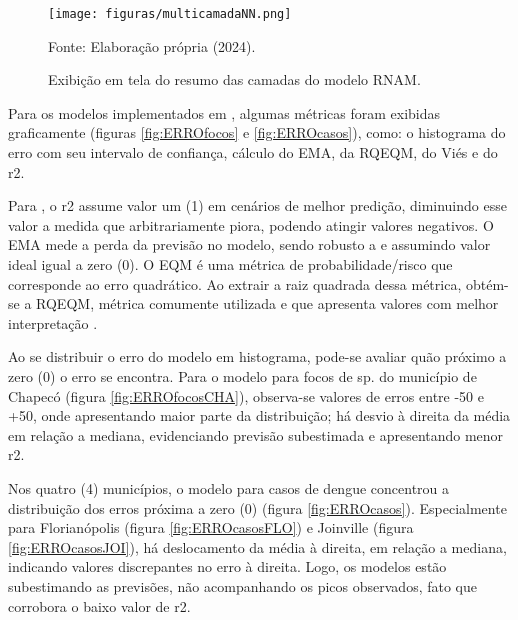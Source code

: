 \begin{figure}[htbp]
    \begin{center}
    \caption{Exibição em tela do resumo das camadas do modelo \acrshort{RNAM}.}
    \label{fig:multicamadaNN}
    \texttt{[image: figuras/multicamadaNN.png]}
    \end{center}
    \small{Fonte: Elaboração própria (2024).}
\end{figure}

\indent Para os modelos implementados em , algumas métricas foram exibidas graficamente (figuras \ref{fig:ERROfocos} e \ref{fig:ERROcasos}), como: o histograma do erro com seu intervalo de confiança, cálculo do \acrfull{EMA}, da \acrfull{RQEQM}, do Viés e do \acrfull{r2}.

\indent Para , o \acrshort{r2} assume valor um (1) em cenários de melhor predição, diminuindo esse valor a medida que arbitrariamente piora, podendo atingir valores negativos. O \acrfull{EMA} mede a perda da previsão no modelo, sendo robusto a  e assumindo valor ideal igual a zero (0). O \acrshort{EQM} é uma métrica de probabilidade/risco que corresponde ao erro quadrático. Ao extrair a raiz quadrada dessa métrica, obtém-se a \acrshort{RQEQM}, métrica comumente utilizada e que apresenta valores com melhor interpretação \cite{sklearn_2013_buitinck}.

\indent Ao se distribuir o erro do modelo em histograma, pode-se avaliar quão próximo a zero (0) o erro se encontra. Para o modelo  para focos de  sp. do município de Chapecó (figura \ref{fig:ERROfocosCHA}), observa-se valores de erros entre -50 e +50, onde apresentando maior parte da distribuição; há desvio à direita da média em relação a mediana, evidenciando previsão subestimada e apresentando menor \acrlong{r2}.

\indent Nos quatro (4) municípios, o modelo  para casos de dengue concentrou a distribuição dos erros próxima a zero (0) (figura \ref{fig:ERROcasos}). Especialmente para Florianópolis (figura \ref{fig:ERROcasosFLO}) e Joinville (figura \ref{fig:ERROcasosJOI}), há deslocamento da média à direita, em relação a mediana, indicando valores discrepantes no erro à direita. Logo, os modelos estão subestimando as previsões, não acompanhando os picos observados, fato que corrobora o baixo valor de \acrlong{r2}. 

